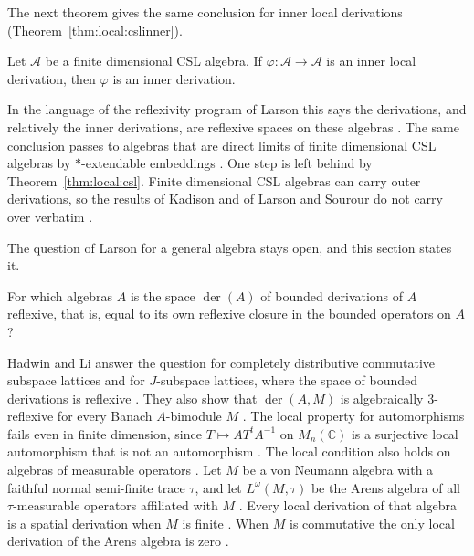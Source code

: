 The next theorem gives the same conclusion for inner local derivations
(Theorem~\ref{thm:local:cslinner}).

\begin{theorem}\label{thm:local:cslinner}
Let $\mathcal{A}$ be a finite dimensional CSL algebra. If
$\varphi\colon\mathcal{A}\to\mathcal{A}$ is an inner local derivation, then
$\varphi$ is an inner derivation.
\end{theorem}

In the language of the reflexivity program of Larson this says the
derivations, and relatively the inner derivations, are reflexive spaces on
these algebras \cite[pp.~78--79]{Crist1996Local}. The same conclusion passes
to algebras that are direct limits of finite dimensional CSL algebras by
$*$-extendable embeddings \cite[p.~78]{Crist1996Local}. One step is left
behind by Theorem~\ref{thm:local:csl}. Finite dimensional CSL algebras can
carry outer derivations, so the results of Kadison and of Larson and Sourour
do not carry over verbatim \cite[p.~79]{Crist1996Local}.

The question of Larson for a general algebra stays open, and this section
states it.

\begin{problem}\label{prob:open:larson}
For which algebras $A$ is the space $\operatorname{der}(A)$ of bounded
derivations of $A$ reflexive, that is, equal to its own reflexive closure in the
bounded operators on $A$?
\end{problem}

Hadwin and Li answer the question for completely distributive commutative
subspace lattices and for $J$-subspace lattices, where the space of bounded
derivations is reflexive \cite[Theorem~2.15, p.~708]{HadwinLi2004}. They also
show that $\operatorname{der}(A,M)$ is algebraically $3$-reflexive for every
Banach $A$-bimodule $M$ \cite[Theorem~2.19, p.~710]{HadwinLi2004}. The local
property for automorphisms fails even in finite dimension, since $T\mapsto
AT^{t}A^{-1}$ on $M_n(\mathbb{C})$ is a surjective local automorphism that is
not an automorphism \cite[p.~713]{HadwinLi2004}. The local condition also
holds on algebras of measurable operators
\cite[p.~1]{AyupovKudaybergenovNurjanovAlauatdinov2011}. Let $M$ be a von
Neumann algebra with a faithful normal semi-finite trace $\tau$, and let
$L^{\omega}(M,\tau)$ be the Arens algebra of all $\tau$-measurable operators
affiliated with $M$ \cite[p.~1]{AyupovKudaybergenovNurjanovAlauatdinov2011}.
Every local derivation of that algebra is a spatial derivation when $M$ is
finite \cite[Theorem~2.4, p.~7]{AyupovKudaybergenovNurjanovAlauatdinov2011}.
When $M$ is commutative the only local derivation of the Arens algebra is zero
\cite[Corollary~2.5, p.~9]{AyupovKudaybergenovNurjanovAlauatdinov2011}.

